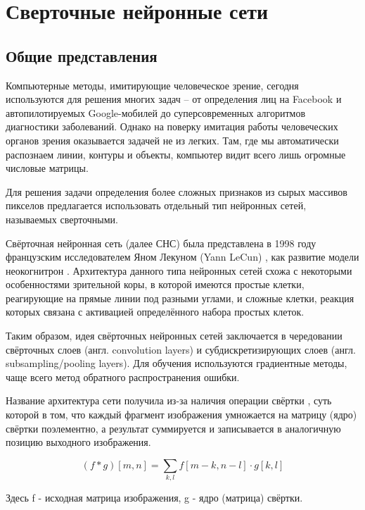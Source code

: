 \documentclass[14pt]{article}
\numberwithin{figure}{section}
\numberwithin{equation}{section}
\begin{document}
\newpage

\section{Сверточные нейронные сети}

\subsection{Общие представления}

Компьютерные методы, имитирующие человеческое зрение, сегодня используются для решения многих задач – от определения лиц на Facebook и автопилотируемых Google-мобилей до суперсовременных алгоритмов диагностики заболеваний. Однако на поверку имитация работы человеческих органов зрения оказывается задачей не из легких. Там, где мы автоматически распознаем линии, контуры и объекты, компьютер видит всего лишь огромные числовые матрицы.

Для решения задачи определения более сложных признаков из сырых массивов пикселов предлагается использовать отдельный тип нейронных сетей, называемых сверточными.

Свёрточная нейронная сеть (далее СНС) была представлена в 1998 году французским исследователем Яном Лекуном (Yann LeCun)%
, как развитие модели неокогнитрон \cite{Fukushima}. Архитектура данного типа нейронных сетей схожа с некоторыми особенностями зрительной коры, в которой имеются простые клетки, реагирующие на прямые линии под разными углами, и сложные клетки, реакция которых связана с активацией определённого набора простых клеток.

Таким образом, идея свёрточных нейронных сетей заключается в чередовании свёрточных слоев (англ. convolution layers) и субдискретизирующих слоев (англ. subsampling/pooling layers). Для обучения используются градиентные методы, чаще всего метод обратного распространения ошибки.

Название архитектура сети получила из-за наличия операции свёртки %
, суть которой в том, что каждый фрагмент изображения умножается на матрицу (ядро) свёртки поэлементно, а результат суммируется и записывается в аналогичную позицию выходного изображения.

\begin{equation}
	(f * g)[m, n] = \sum_{k,l}{f[m - k, n - l] \cdot g[k, l]}
\end{equation}

Здесь f - исходная матрица изображения, g - ядро (матрица) свёртки.
\end{document}

